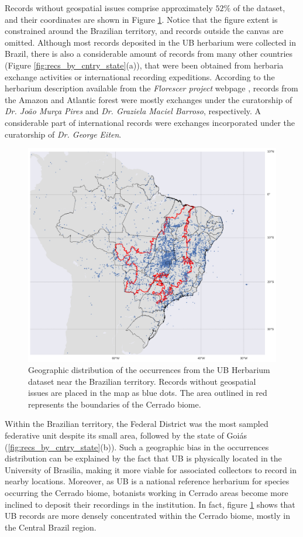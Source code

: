 Records without geospatial issues comprise approximately $52\%$ of the dataset, and their coordinates are shown in Figure \ref{fig:occurrence_map}. Notice that the figure extent is constrained around the Brazilian territory, and records outside the canvas are omitted. Although most records deposited in the UB herbarium were collected in Brazil, there is also a considerable amount of records from many other countries (Figure \ref{fig:recs_by_cntry_state}(a)), that were been obtained from herbaria exchange activities or international recording expeditions. According to the herbarium description available from the \textit{Florescer project} webpage \cite{florescer}, records from the Amazon and Atlantic forest were mostly exchanges under the curatorship of \textit{Dr. João Murça Pires} and \textit{Dr. Graziela Maciel Barroso}, respectively. A considerable part of international records were exchanges incorporated under the curatorship of \textit{Dr. George Eiten}.  


  \begin{figure}[h!]
  	\centering
    \includegraphics[width=0.7\linewidth]{figures/occurrence_map.png}
    \caption{Geographic distribution of the occurrences from the UB Herbarium dataset near the Brazilian territory. Records without geospatial issues are placed in the map as blue dots. The area outlined in red represents the boundaries of the Cerrado biome.}
    \label{fig:occurrence_map}
  \end{figure}
  
Within the Brazilian territory, the Federal District was the most sampled federative unit despite its small area, followed by the state of Goiás (\ref{fig:recs_by_cntry_state}(b)). 
Such a geographic bias in the occurrences distribution can be explained by the fact that UB is physically located in the University of Brasilia, making it more viable for associated collectors to record in nearby locations.
Moreover, as UB is a national reference herbarium for species occurring the Cerrado biome, botanists working in Cerrado areas become more inclined to deposit their recordings in the institution.
In fact, figure \ref{fig:occurrence_map} shows that UB records are more densely concentrated within the Cerrado biome, mostly in the Central Brazil region. 

